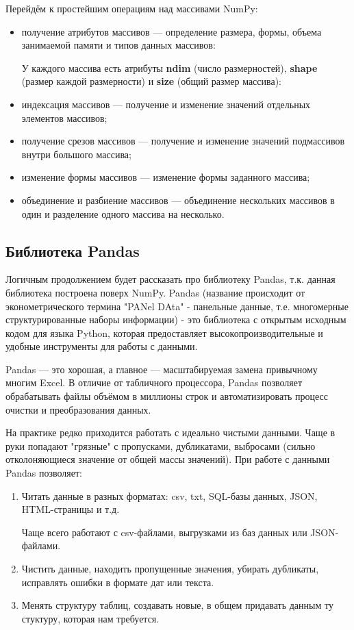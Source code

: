 \documentclass[pract]{SCWorks}
\begin{document}
Перейдём к простейшим операциям над массивами NumPy:

\begin{itemize}
    \item получение атрибутов массивов — определение размера, формы, объема занимаемой памяти и типов 
    данных массивов:

    У каждого массива есть атрибуты \textbf{ndim} (число размерностей), \textbf{shape} (размер каждой
    размерности) и \textbf{size} (общий размер массива):

    \item индексация массивов — получение и изменение значений отдельных элементов массивов;
    \item получение срезов массивов — получение и изменение значений подмассивов внутри большого массива;
    \item изменение формы массивов — изменение формы заданного массива;
    \item объединение и разбиение массивов — объединение нескольких массивов в один и разделение одного массива на несколько.
\end{itemize}

\subsection{Библиотека Pandas}

Логичным продолжением будет рассказать про библиотеку Pandas, т.к. данная библиотека построена поверх NumPy. 
Pandas (название происходит от эконометрического термина "PANel DAta" - панельные данные, т.е. многомерные 
структурированные наборы информации) - это библиотека с открытым исходным кодом для языка Python, 
которая предоставляет высокопроизводительные и удобные инструменты для работы с данными. 

Pandas — это хорошая, а главное — масштабируемая замена привычному многим Excel. В отличие от табличного 
процессора, Pandas позволяет обрабатывать файлы объёмом в миллионы строк и автоматизировать процесс 
очистки и преобразования данных.

На практике редко приходится работать с идеально чистыми данными. Чаще в руки попадают "грязные" с 
пропусками, дубликатами, выбросами (сильно отколоняющиеся значение от общей массы значений).
При работе с данными Pandas позволяет:

\begin{enumerate}
    \item Читать данные в разных форматах: csv, txt, SQL-базы данных, JSON, HTML-страницы и т.д.
    
    Чаще всего работают с csv-файлами, выгрузками из баз данных или JSON-файлами.
    \item Чистить данные, находить пропущенные значения, убирать дубликаты, исправлять ошибки в формате дат или текста.
    \item Менять структуру таблиц, создавать новые, в общем придавать данным ту стуктуру, которая нам требуется. 
\end{enumerate}
\end{document}
